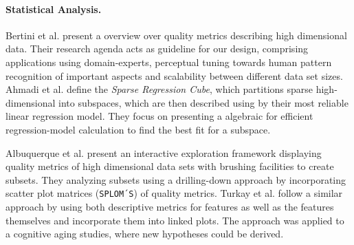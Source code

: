 \documentclass[journal]{style/vgtc} 			          %
\begin{document}
\paragraph{Statistical Analysis.}
Bertini et al. \cite{Bertini} present a overview over quality metrics describing high dimensional data.
Their research agenda acts as guideline for our design, comprising applications using domain-experts, perceptual tuning towards human pattern recognition of important aspects and scalability between different data set sizes.
Ahmadi et al. \cite{Ahmadi} define the \emph{Sparse Regression Cube}, which partitions sparse high-dimensional into subspaces, which are then described using by their most reliable linear regression model.
They focus on presenting a algebraic for efficient regression-model calculation to find the best fit for a subspace.

Albuquerque et al. \cite{Albuquerque} present an interactive exploration framework displaying quality metrics of high dimensional data sets with brushing facilities to create subsets.
They analyzing subsets using a drilling-down approach by incorporating scatter plot matrices (\texttt{SPLOM´S}) of quality metrics. %
Turkay et al. \cite{Turkay} follow a similar approach by using both descriptive metrics for features as well as the features themselves and incorporate them into linked plots.
The approach was applied to a cognitive aging studies, where new hypotheses could be derived.
\end{document}
